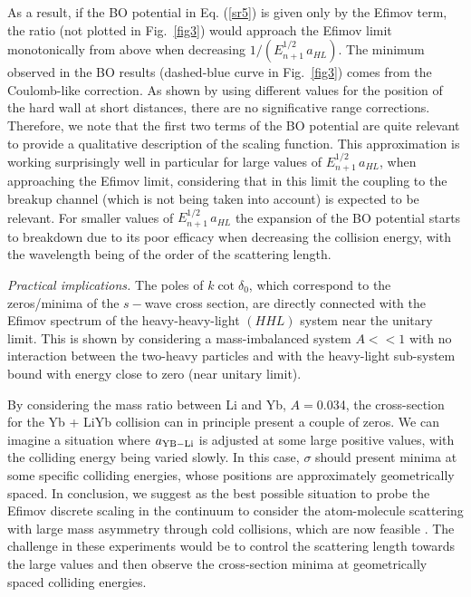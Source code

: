 \documentclass[twocolumn,amsmath,amssymb,epsfig,aps,prl]{revtex4}
\begin{document}
As a result, if  the BO potential in Eq. (\ref{sr5}) is given only by the Efimov term, the ratio (not plotted in Fig.~\ref{fig3}) 
would approach the Efimov limit monotonically from above when decreasing $1/(E_{n+1}^{1/2}\, a_{HL})$. 
The minimum observed in the BO results (dashed-blue curve in Fig.~\ref{fig3}) comes from the Coulomb-like correction. 
As shown by using different values for the position of the hard wall at short distances, there are no significative  
range corrections. 
Therefore, we note that the first two terms of the BO potential are quite relevant to provide a qualitative description of 
the scaling function. 
This approximation is working surprisingly well in particular for large values of $E_{n+1}^{1/2}\, a_{HL}$, when 
approaching the Efimov limit, considering that in this limit the coupling to the breakup channel (which is not being
taken into account) is expected to be relevant.
For smaller values of $E_{n+1}^{1/2}\, a_{HL}$ the expansion of the BO potential starts to 
breakdown
due to its poor efficacy when decreasing the collision energy, with the wavelength being of the order of the scattering 
length. 


{\it Practical implications.}
The poles of $k\cot\delta_0$, which correspond to the zeros/minima of the $s-$wave cross section,
are directly connected with the Efimov spectrum of the heavy-heavy-light $(HHL)$ system near 
the unitary limit. This is shown by considering a mass-imbalanced system $A<<1$ with no interaction 
between the two-heavy particles and with the heavy-light sub-system bound with energy close to zero (near unitary limit). 

By considering the mass ratio between Li and Yb, $A=$0.034, the cross-section for the Yb + LiYb collision
can in principle present a couple of zeros. 
We can imagine a situation where $a_{\rm {YB-Li}}$ is adjusted at some large positive values, with the colliding energy
being varied slowly. In this case, $\sigma$ should 
present minima at some specific colliding energies, whose positions are approximately geometrically spaced.
In conclusion, we suggest as the best possible situation to probe the Efimov discrete scaling in the continuum to consider the
atom-molecule scattering with large mass asymmetry through cold collisions, which are now feasible
\cite{2006krems}. The challenge in these experiments would be to control the scattering length towards the large 
values and then observe the cross-section minima at geometrically spaced colliding energies.
\end{document}
